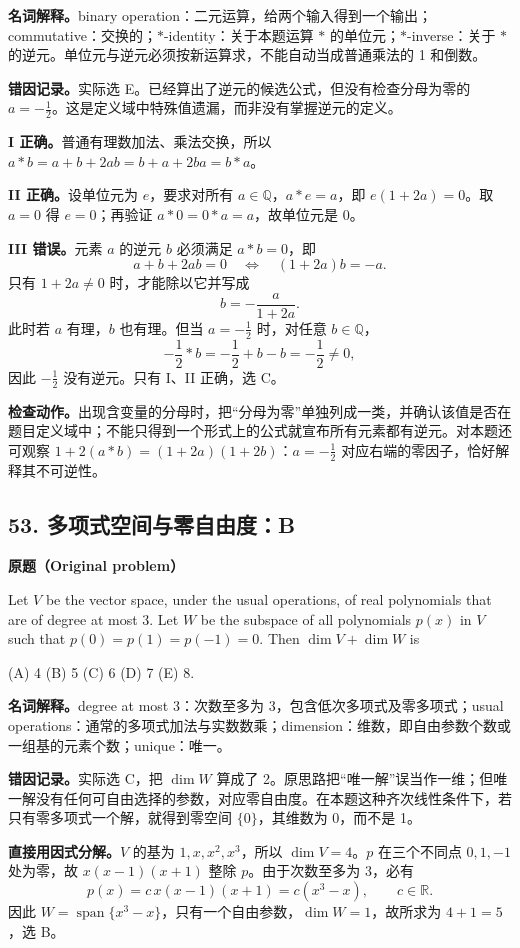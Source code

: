 \documentclass[11pt,a4paper,fontset=fandol]{ctexart}
\begin{document}
\textbf{名词解释。}binary operation：二元运算，给两个输入得到一个输出；commutative：交换的；$*$-identity：关于本题运算 $*$ 的单位元；$*$-inverse：关于 $*$ 的逆元。单位元与逆元必须按新运算求，不能自动当成普通乘法的 1 和倒数。

\textbf{错因记录。}实际选 E。已经算出了逆元的候选公式，但没有检查分母为零的 $a=-\frac12$。这是定义域中特殊值遗漏，而非没有掌握逆元的定义。

\textbf{I 正确。}普通有理数加法、乘法交换，所以 $a*b=a+b+2ab=b+a+2ba=b*a$。

\textbf{II 正确。}设单位元为 $e$，要求对所有 $a\in\mathbb Q$，$a*e=a$，即 $e(1+2a)=0$。取 $a=0$ 得 $e=0$；再验证 $a*0=0*a=a$，故单位元是 0。

\textbf{III 错误。}元素 $a$ 的逆元 $b$ 必须满足 $a*b=0$，即
\[
a+b+2ab=0\quad\Longleftrightarrow\quad(1+2a)b=-a.
\]
只有 $1+2a\ne0$ 时，才能除以它并写成
\[
b=-\frac{a}{1+2a}.
\]
此时若 $a$ 有理，$b$ 也有理。但当 $a=-\frac12$ 时，对任意 $b\in\mathbb Q$，
\[
-\frac12*b=-\frac12+b-b=-\frac12\ne0,
\]
因此 $-\frac12$ 没有逆元。只有 I、II 正确，选 C。

\textbf{检查动作。}出现含变量的分母时，把“分母为零”单独列成一类，并确认该值是否在题目定义域中；不能只得到一个形式上的公式就宣布所有元素都有逆元。对本题还可观察 $1+2(a*b)=(1+2a)(1+2b)$：$a=-\frac12$ 对应右端的零因子，恰好解释其不可逆性。

\subsection{53. 多项式空间与零自由度：B}
\label{p4:q53}
\textbf{原题（Original problem）}

Let $V$ be the vector space, under the usual operations, of real polynomials that are of degree at most 3. Let $W$ be the subspace of all polynomials $p(x)$ in $V$ such that $p(0)=p(1)=p(-1)=0$. Then $\dim V+\dim W$ is

(A) 4 \quad (B) 5 \quad (C) 6 \quad (D) 7 \quad (E) 8.

\textbf{名词解释。}degree at most 3：次数至多为 3，包含低次多项式及零多项式；usual operations：通常的多项式加法与实数数乘；dimension：维数，即自由参数个数或一组基的元素个数；unique：唯一。

\textbf{错因记录。}实际选 C，把 $\dim W$ 算成了 2。原思路把“唯一解”误当作一维；但唯一解没有任何可自由选择的参数，对应零自由度。在本题这种齐次线性条件下，若只有零多项式一个解，就得到零空间 $\{0\}$，其维数为 0，而不是 1。

\textbf{直接用因式分解。}$V$ 的基为 $1,x,x^2,x^3$，所以 $\dim V=4$。$p$ 在三个不同点 $0,1,-1$ 处为零，故 $x(x-1)(x+1)$ 整除 $p$。由于次数至多为 3，必有
\[
p(x)=c\,x(x-1)(x+1)=c(x^3-x),\qquad c\in\mathbb R.
\]
因此 $W=\operatorname{span}\{x^3-x\}$，只有一个自由参数，$\dim W=1$，故所求为 $4+1=\boxed5$，选 B。
\end{document}
